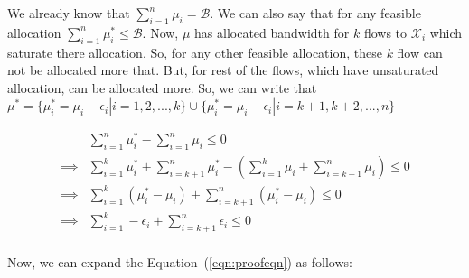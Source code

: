We already know that $\sum_{i=1}^{n} \mu_i = \mathcal{B}$. We can also say that for any feasible allocation  $\sum_{i=1}^{n} \mu_i^* \le \mathcal{B}$. Now, $\mu$ has allocated bandwidth for $k$ flows to $\mathcal{X}_i$ which saturate there allocation. So, for any other feasible allocation, these $k$ flow can not be allocated more that. But, for rest of the flows, which have unsaturated allocation, can be allocated more. So, we can write that $\mu^* = \{\mu_i^* = \mu_i - \epsilon_i | i=1,2,...,k\}\cup\{\mu_i^* = \mu_i - \epsilon_i | i=k+1,k+2,...,n\}$

\begin{equation}
\label{eqn:case3-4}
\begin{split}
&\sum_{i=1}^{n} \mu_i^* - \sum_{i=1}^{n} \mu_i \le 0 \\
\implies & \sum_{i=1}^{k} \mu_i^* + \sum_{i=k+1}^{n} \mu_i^* - \left( \sum_{i=1}^{k} \mu_i + \sum_{i=k+1}^{n} \mu_i \right) \le 0 \\
\implies & \sum_{i=1}^{k} (\mu_i^* - \mu_i) + \sum_{i=k+1}^{n} (\mu_i^* - \mu_i) \le 0 \\
\implies & \sum_{i=1}^{k} -\epsilon_i + \sum_{i=k+1}^{n} \epsilon_i \le 0 \\
\end{split}
\end{equation}



Now, we can expand the Equation~(\ref{eqn:proofeqn}) as follows:

